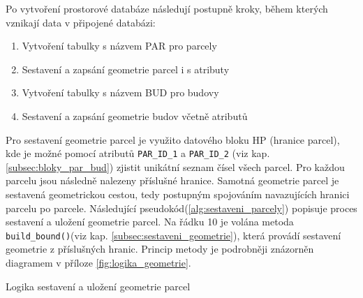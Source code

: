 
Po vytvoření prostorové databáze následují postupně kroky, během
kterých vznikají data v připojené databázi:
\begin{enumerate}[leftmargin=50pt]
\item Vytvoření tabulky s názvem PAR pro parcely
\item Sestavení a zapsání geometrie parcel i s atributy
\item Vytvoření tabulky s názvem BUD pro budovy
\item Sestavení a zapsání geometrie budov včetně atributů
\end{enumerate}

Pro sestavení geometrie parcel je využito datového bloku HP (hranice
parcel), kde je možné pomocí atributů \verb|PAR_ID_1| a
\verb|PAR_ID_2| (viz kap. \ref{subsec:bloky_par_bud}) zjistit unikátní seznam
čísel všech parcel. Pro každou parcelu jsou následně nalezeny
příslušné hranice. Samotná geometrie parcel je sestavená geometrickou
cestou, tedy postupným spojováním navazujících hranici parcelu po
parcele. Následující pseudokód(\ref{alg:sestaveni_parcely}) popisuje
proces sestavení a uložení geometrie parcel. Na řádku 10 je volána
metoda \verb|build_bound()|(viz kap. \ref{subsec:sestaveni_geometrie}), která
provádí sestavení geometrie z příslušných hranic. Princip metody je
podrobněji znázorněn diagramem v příloze \ref{fig:logika_geometrie}.

\begin{algorithm}
\caption{Logika sestavení a uložení geometrie parcel}
\label{alg:sestaveni_parcely}
	\begin{algorithmic}[1]
		\ENDFOR
		\ELSE
		\ENDIF
	\ENDFOR
	\end{algorithmic}
\end{algorithm}

